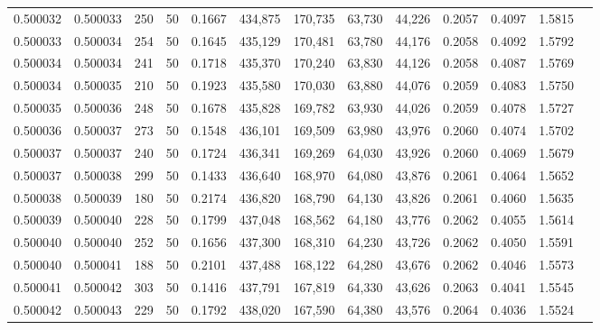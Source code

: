 \begin{tabular}{rrrrrrrrrrrrr}
0.500032 & 0.500033 & 250 &  50 &                                     0.1667 & 434,875 & 170,735 &  63,730 &  44,226 & 0.2057 & 0.4097 & 1.5815 \\
0.500033 & 0.500034 & 254 &  50 &                                     0.1645 & 435,129 & 170,481 &  63,780 &  44,176 & 0.2058 & 0.4092 & 1.5792 \\
0.500034 & 0.500034 & 241 &  50 &                                     0.1718 & 435,370 & 170,240 &  63,830 &  44,126 & 0.2058 & 0.4087 & 1.5769 \\
0.500034 & 0.500035 & 210 &  50 &                                     0.1923 & 435,580 & 170,030 &  63,880 &  44,076 & 0.2059 & 0.4083 & 1.5750 \\
0.500035 & 0.500036 & 248 &  50 &                                     0.1678 & 435,828 & 169,782 &  63,930 &  44,026 & 0.2059 & 0.4078 & 1.5727 \\
0.500036 & 0.500037 & 273 &  50 &                                     0.1548 & 436,101 & 169,509 &  63,980 &  43,976 & 0.2060 & 0.4074 & 1.5702 \\
0.500037 & 0.500037 & 240 &  50 &                                     0.1724 & 436,341 & 169,269 &  64,030 &  43,926 & 0.2060 & 0.4069 & 1.5679 \\
0.500037 & 0.500038 & 299 &  50 &                                     0.1433 & 436,640 & 168,970 &  64,080 &  43,876 & 0.2061 & 0.4064 & 1.5652 \\
0.500038 & 0.500039 & 180 &  50 &                                     0.2174 & 436,820 & 168,790 &  64,130 &  43,826 & 0.2061 & 0.4060 & 1.5635 \\
0.500039 & 0.500040 & 228 &  50 &                                     0.1799 & 437,048 & 168,562 &  64,180 &  43,776 & 0.2062 & 0.4055 & 1.5614 \\
0.500040 & 0.500040 & 252 &  50 &                                     0.1656 & 437,300 & 168,310 &  64,230 &  43,726 & 0.2062 & 0.4050 & 1.5591 \\
0.500040 & 0.500041 & 188 &  50 &                                     0.2101 & 437,488 & 168,122 &  64,280 &  43,676 & 0.2062 & 0.4046 & 1.5573 \\
0.500041 & 0.500042 & 303 &  50 &                                     0.1416 & 437,791 & 167,819 &  64,330 &  43,626 & 0.2063 & 0.4041 & 1.5545 \\
0.500042 & 0.500043 & 229 &  50 &                                     0.1792 & 438,020 & 167,590 &  64,380 &  43,576 & 0.2064 & 0.4036 & 1.5524 \\

\end{tabular}
